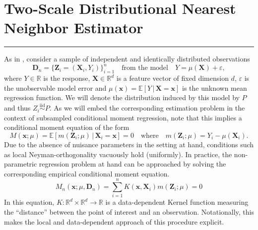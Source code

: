 \documentclass[letterpaper,10pt]{article}
\numberwithin{equation}{section}
\numberwithin{thm}{section}
\newcommand{\1}{\mathbb{1}}
\begin{document}
\section{Two-Scale Distributional Nearest Neighbor Estimator}\label{TDNN}
\hrule
As in \citet{demirkaya_optimal_2024}, consider a sample of independent and identically distributed observations
\begin{equation}\label{DGP}
	\mathbf{D}_n = \{\mathbf{Z}_i = (\mathbf{X}_i, Y_i)\}_{i = 1}^{n}
	\quad \text{from the model} \quad
	Y = \mu(\mathbf{X}) + \varepsilon,
\end{equation}
where $Y \in \mathbb{R}$ is the response, $\mathbf{X} \in \mathbb{R}^d$ is a feature vector of fixed dimension $d$, $\varepsilon$ is the unobservable model error and $\mu(\mathbf{x}) = \mathbb{E}\left[Y \, | \, \mathbf{X} = \mathbf{x}\right]$ is the unknown mean regression function.
We will denote the distribution induced by this model by $P$ and thus $Z_i \overset{\text{iid}}{\sim} P$.
As we will embed the corresponding estimation problem in the context of subsampled conditional moment regression, note that this implies a conditional moment equation of the form
\begin{equation}\label{CondMomEq}
	M(\mathbf{x}; \mu)
	= \mathbb{E}\left[m(\mathbf{Z}_i; \mu) \, | \, \mathbf{X}_i = \mathbf{x}\right]
	= 0
	\quad \text{where} \quad
	m(\mathbf{Z}_i; \mu) = Y_i - \mu(\mathbf{X}_i).
\end{equation}
Due to the absence of nuisance parameters in the setting at hand, conditions such as local Neyman-orthogonality vacuously hold (uniformly).
In practice, the non-parametric regression problem at hand can be approached by solving the corresponding empirical conditional moment equation.
\begin{equation}\label{EmpCondMomEq}
	M_n(\mathbf{x}; \mu, \mathbf{D}_n)
	= \sum_{i = 1}^{n}K(\mathbf{x}, \mathbf{X}_i)m(\mathbf{Z}_i; \mu)
	= 0
\end{equation}
In this equation, $K:\mathbb{R}^d \times \mathbb{R}^d \rightarrow \mathbb{R}$ is a data-dependent Kernel function measuring the ``distance'' between the point of interest and an observation.
Notationally, this makes the local and data-dependent approach of this procedure explicit.
\end{document}
